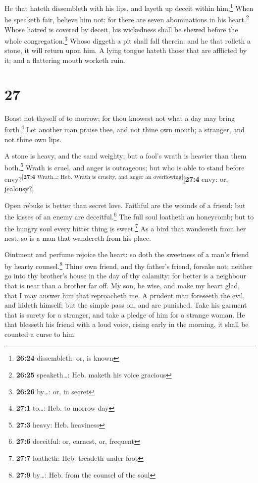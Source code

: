  He that hateth dissembleth with his lips, and layeth up
deceit within him;\footnote{\textbf{26:24} dissembleth: or, is known}
 When he speaketh fair, believe him not: for there are
seven abominations in his heart.\footnote{\textbf{26:25} speaketh\ldots:
  Heb. maketh his voice gracious}  Whose hatred is
covered by deceit, his wickedness shall be shewed before the whole
congregation.\footnote{\textbf{26:26} by\ldots: or, in secret}
 Whoso diggeth a pit shall fall therein: and he that
rolleth a stone, it will return upon him.  A lying tongue
hateth those that are afflicted by it; and a flattering mouth worketh
ruin.

\hypertarget{section-26}{%
\section{27}\label{section-26}}

 Boast not thyself of to morrow; for thou knowest not what
a day may bring forth.\footnote{\textbf{27:1} to\ldots: Heb. to morrow
  day}  Let another man praise thee, and not thine own
mouth; a stranger, and not thine own lips.

 A stone is heavy, and the sand weighty; but a fool's
wrath is heavier than them both.\footnote{\textbf{27:3} heavy: Heb.
  heaviness}  Wrath is cruel, and anger is outrageous; but
who is able to stand before envy?\textsuperscript{{[}\textbf{27:4}
Wrath\ldots: Heb. Wrath is cruelty, and anger an
overflowing{]}}{[}\textbf{27:4} envy: or, jealousy?{]}

 Open rebuke is better than secret love. 
Faithful are the wounds of a friend; but the kisses of an enemy are
deceitful.\footnote{\textbf{27:6} deceitful: or, earnest, or, frequent}
 The full soul loatheth an honeycomb; but to the hungry
soul every bitter thing is sweet.\footnote{\textbf{27:7} loatheth: Heb.
  treadeth under foot}  As a bird that wandereth from her
nest, so is a man that wandereth from his place.

 Ointment and perfume rejoice the heart: so doth the
sweetness of a man's friend by hearty counsel.\footnote{\textbf{27:9}
  by\ldots: Heb. from the counsel of the soul}  Thine own
friend, and thy father's friend, forsake not; neither go into thy
brother's house in the day of thy calamity: for better is a neighbour
that is near than a brother far off.  My son, be wise,
and make my heart glad, that I may answer him that reproacheth me.
 A prudent man foreseeth the evil, and hideth himself;
but the simple pass on, and are punished.  Take his
garment that is surety for a stranger, and take a pledge of him for a
strange woman.  He that blesseth his friend with a loud
voice, rising early in the morning, it shall be counted a curse to him.

